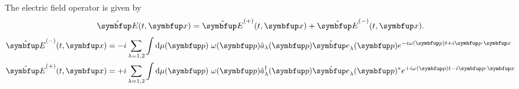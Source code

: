 The electric field operator is given by
\begin{equation}
	\vu{E}(t,\vb{x})
	=
	\vu{E}^{(+)}(t,\vb{x})
	+
	\vu{E}^{(-)}(t,\vb{x})
	.
\end{equation}
\begin{align}
	\vu{E}^{(-)}(t,\vb{x})
	&=
	-i
	\sum_{\lambda=1,2}
	\int\dd{\mu(\vb{p})}
	\omega(\vb{p})
	\hat{a}_\lambda(\vb{p})
	\vu{e}_\lambda(\vb{p})
	e^{-i\omega(\vb{p})t+i\vb{p}\vdot\vb{x}}
	\\
	\vu{E}^{(+)}(t,\vb{x})
	&=
	+i
	\sum_{\lambda=1,2}
	\int\dd{\mu(\vb{p})}
	\omega(\vb{p})
	\hat{a}_\lambda^\dagger(\vb{p})
	\vu{e}_\lambda(\vb{p})^*
	e^{+i\omega(\vb{p})t-i\vb{p}\vdot\vb{x}}
\end{align}